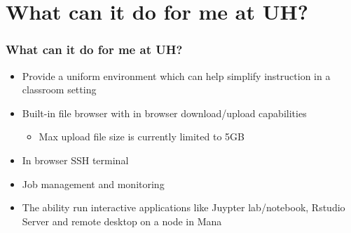 \section[Why]{What can it do for me at UH?}
\begin{frame}
	\frametitle{What can it do for me at UH?}
	\begin{itemize}
	\item Provide a uniform environment which can help simplify instruction in a classroom setting
	\item Built-in file browser with in browser download/upload capabilities
		\begin{itemize}
		\item Max upload file size is currently limited to 5GB
		\end{itemize}
	\item In browser SSH terminal
	\item Job management and monitoring
	\item The ability run interactive applications like Juypter lab/notebook, Rstudio Server and remote desktop on a node in Mana
	\end{itemize}
\end{frame}

